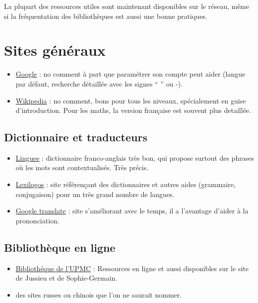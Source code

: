 
La plupart des ressources utiles sont maintenant disponibles sur le réseau,
même si la fréquentation des bibliothèques est aussi une bonne pratiques.


\section{Sites généraux}
\begin{itemize}
 \item \href{www.google.com}{Google} : 
no comment à part que paramétrer son compte
peut aider (langue par défaut, recherche détaillée avec les signes `` '' ou -).

\item \href{http://wikipedia.org/}{Wikipedia} : no comment, 
bons pour tous les niveaux, spécialement en guise d'introduction. Pour les maths,
la version française est souvent plus detaillée.

\end{itemize}




\subsection{Dictionnaire et traducteurs}

\begin{itemize}
\item \href{http://www.linguee.com/}{Linguee} : dictionnaire franco-anglais très bon, qui propose 
surtout des phrases où les mots sont contextualisés. Très précis.
\item \href{http://www.lexilogos.com/}{Lexilogos} : site référençant des dictionnaires et autres
aides (grammaire, conjugaison) pour un très grand nombre de langues. 
\item \href{https://translate.google.fr/}{Google translate} : site s'améliorant avec le temps, 
il a l'avantage d'aider à la prononciation.
\end{itemize}


\subsection{Biblioth\`eque en ligne}

\begin{itemize}

\item \href{http://catalogue-bibliotheques.upmc.fr/#focus}{Biblioth\'eque de l'UPMC} : Ressources en 
ligne et aussi disponibles sur le site de Jussieu et de Sophie-Germain.

\item des sites russes ou chinois que l'on ne saurait nommer.

\end{itemize}


